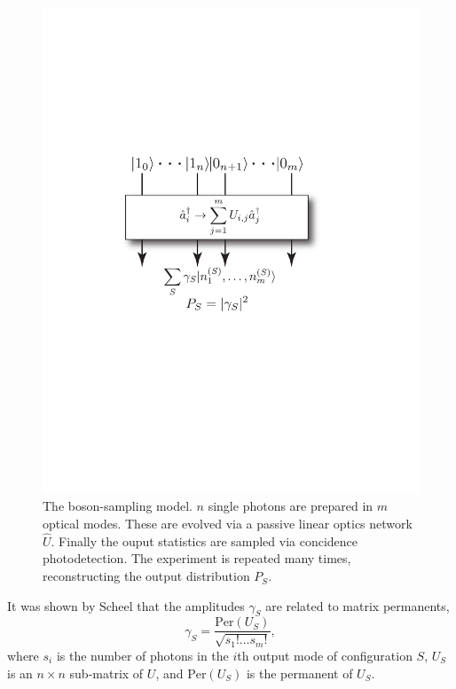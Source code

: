 \documentclass[aps,pra,twocolumn,amsmath,amssymb,nofootinbib,superscriptaddress]{revtex4}
\begin{document}
\begin{figure}[!htb]
\includegraphics[width=0.7\columnwidth]{model}
\caption{The boson-sampling model. $n$ single photons are prepared in $m$ optical modes. These are evolved via a passive linear optics network $\hat{U}$. Finally the ouput statistics are sampled via concidence photodetection. The experiment is repeated many times, reconstructing the output distribution $P_S$.} \label{fig:model}
\end{figure}

It was shown by Scheel \cite{bib:Scheel04perm} that the amplitudes $\gamma_S$ are related to matrix permanents,
\begin{equation}
\gamma_S = \frac{\mathrm{Per}(U_S)}{\sqrt{s_1!\dots s_m!}},
\end{equation}
where $s_i$ is the number of photons in the $i$th output mode of configuration $S$, $U_S$ is an \mbox{$n\times n$} sub-matrix of $U$, and \mbox{$\mathrm{Per}(U_S)$} is the permanent of $U_S$.
\end{document}
